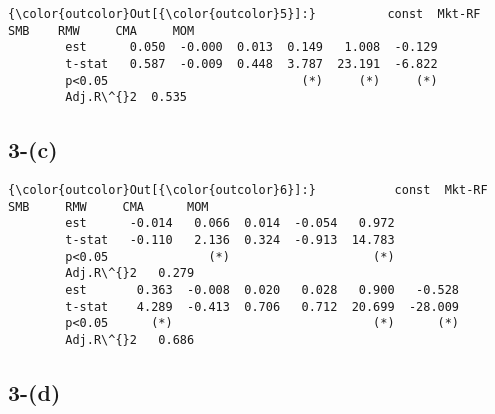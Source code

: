 \documentclass[11pt]{article}
\begin{document}
            \begin{Verbatim}[commandchars=\\\{\}]
{\color{outcolor}Out[{\color{outcolor}5}]:}          const  Mkt-RF    SMB    RMW     CMA     MOM
        est      0.050  -0.000  0.013  0.149   1.008  -0.129
        t-stat   0.587  -0.009  0.448  3.787  23.191  -6.822
        p<0.05                           (*)     (*)     (*)
        Adj.R\^{}2  0.535                                      
\end{Verbatim}
        
    \subsection*{3-(c)}\label{c}


            \begin{Verbatim}[commandchars=\\\{\}]
{\color{outcolor}Out[{\color{outcolor}6}]:}           const  Mkt-RF    SMB     RMW     CMA      MOM
        est      -0.014   0.066  0.014  -0.054   0.972         
        t-stat   -0.110   2.136  0.324  -0.913  14.783         
        p<0.05              (*)                    (*)         
        Adj.R\^{}2   0.279                                        
        est       0.363  -0.008  0.020   0.028   0.900   -0.528
        t-stat    4.289  -0.413  0.706   0.712  20.699  -28.009
        p<0.05      (*)                            (*)      (*)
        Adj.R\^{}2   0.686                                        
\end{Verbatim}
        
    \subsection*{3-(d)}\label{d}
\end{document}
